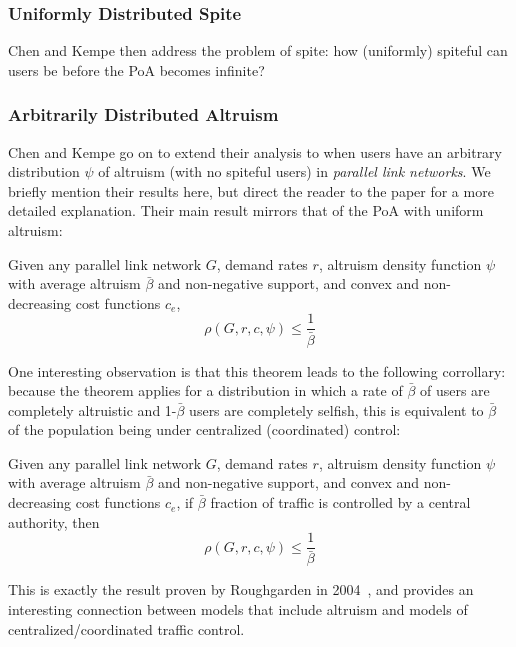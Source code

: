 \subsubsection{Uniformly Distributed Spite}
Chen and Kempe then address the problem of spite: how (uniformly) spiteful can users be before the PoA becomes infinite?


\subsubsection{Arbitrarily Distributed Altruism}
Chen and Kempe go on to extend their analysis to when users have an arbitrary distribution $\psi$ of altruism (with no spiteful users) in \emph{parallel link networks}. We briefly mention their results here, but direct the reader to the paper for a more detailed explanation. 
Their main result mirrors that of the PoA with uniform altruism:
\begin{theorem}
Given any parallel link network $G$, demand rates $r$, altruism density function $\psi$ with average altruism $\bar{\beta}$ and non-negative support, and convex and non-decreasing cost functions $c_e$,
   $$\rho(G,r,c,\psi) \le \frac{1}{\bar{\beta}}$$
\end{theorem}
One interesting observation is that this theorem leads to the following corrollary: because the theorem applies for a distribution in which a rate of $\bar{\beta}$ of users are completely altruistic and 1-$\bar{\beta}$ users are completely selfish, this is equivalent to $\bar{\beta}$ of the population being under centralized (coordinated) control:
\begin{corollary}
Given any parallel link network $G$, demand rates $r$, altruism density function $\psi$ with average altruism $\bar{\beta}$ and non-negative support, and convex and non-decreasing cost functions $c_e$,
if $\bar{\beta}$ fraction of traffic is controlled by a central authority, then
   $$\rho(G,r,c,\psi) \le \frac{1}{\bar{\beta}}$$
\end{corollary}
This is exactly the result proven by Roughgarden in 2004~\cite{roughgarden04}, and provides an interesting connection between models that include altruism and models of centralized/coordinated traffic control.

